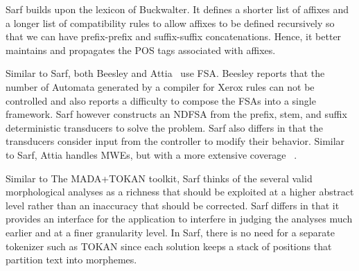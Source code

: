 \documentclass[11pt]{article}
\begin{document}
Sarf builds upon the lexicon of Buckwalter. %
It defines a shorter list of affixes
and a longer list of 
compatibility rules to allow 
affixes to be defined recursively
so that we can have prefix-prefix and suffix-suffix 
concatenations.
Hence, it better maintains and propagates 
the POS tags associated with affixes. 

Similar to Sarf, both Beesley %
and Attia~ use
FSA.
Beesley reports that the number of Automata generated by a compiler
for Xerox rules can not be controlled and also reports a difficulty 
to compose the FSAs into a single framework. 
Sarf however constructs an NDFSA from 
the prefix, stem, and suffix deterministic 
transducers to solve the problem.
Sarf also differs in that 
the transducers consider
input from the controller to modify their behavior. 
Similar to Sarf, Attia handles MWEs, but with a more extensive coverage
~\cite{Attia:06,Attia:10}.

Similar to The MADA+TOKAN toolkit, Sarf thinks of
the several valid morphological analyses as a richness that 
should be exploited at a higher abstract level rather than
an inaccuracy that should be corrected. 
Sarf differs in that it provides an interface for the 
application to interfere in judging the analyses much earlier and
at a finer granularity level. 
In Sarf, there is no need for a separate tokenizer such as
TOKAN since each solution keeps a stack of positions
that partition text into morphemes.
\end{document}
